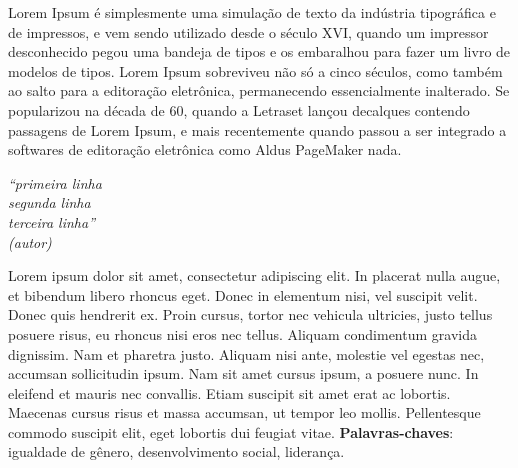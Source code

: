 \documentclass[
	12pt,				%
	a4paper,			%
    openany,
    oneside,
	english,			%
	french,				%
	spanish,			%
	brazil,				%
	]{abntex2}
\begin{document}

\frenchspacing 







\begin{agradecimentos}
Lorem Ipsum é simplesmente uma simulação de texto da indústria tipográfica e de impressos, e vem sendo utilizado desde o século XVI, quando um impressor desconhecido pegou uma bandeja de tipos e os embaralhou para fazer um livro de modelos de tipos. Lorem Ipsum sobreviveu não só a cinco séculos, como também ao salto para a editoração eletrônica, permanecendo essencialmente inalterado. Se popularizou na década de 60, quando a Letraset lançou decalques contendo passagens de Lorem Ipsum, e mais recentemente quando passou a ser integrado a softwares de editoração eletrônica como Aldus PageMaker nada.
\end{agradecimentos}

\begin{epigrafe}
    \vspace*{\fill}
	\begin{flushright}
		\textit{``primeira linha \\
		segunda linha \\
        terceira linha''\\
		(autor)}
	\end{flushright}
\end{epigrafe}
\setlength{\absparsep}{18pt} %
\begin{resumo}
Lorem ipsum dolor sit amet, consectetur adipiscing elit. In placerat nulla augue, et bibendum libero rhoncus eget. Donec in elementum nisi, vel suscipit velit. Donec quis hendrerit ex. Proin cursus, tortor nec vehicula ultricies, justo tellus posuere risus, eu rhoncus nisi eros nec tellus. Aliquam condimentum gravida dignissim. Nam et pharetra justo. Aliquam nisi ante, molestie vel egestas nec, accumsan sollicitudin ipsum. Nam sit amet cursus ipsum, a posuere nunc. In eleifend et mauris nec convallis. Etiam suscipit sit amet erat ac lobortis. Maecenas cursus risus et massa accumsan, ut tempor leo mollis. Pellentesque commodo suscipit elit, eget lobortis dui feugiat vitae.  \noindent
 \textbf{Palavras-chaves}: igualdade de gênero, desenvolvimento social, liderança.
\end{resumo}
\end{document}
